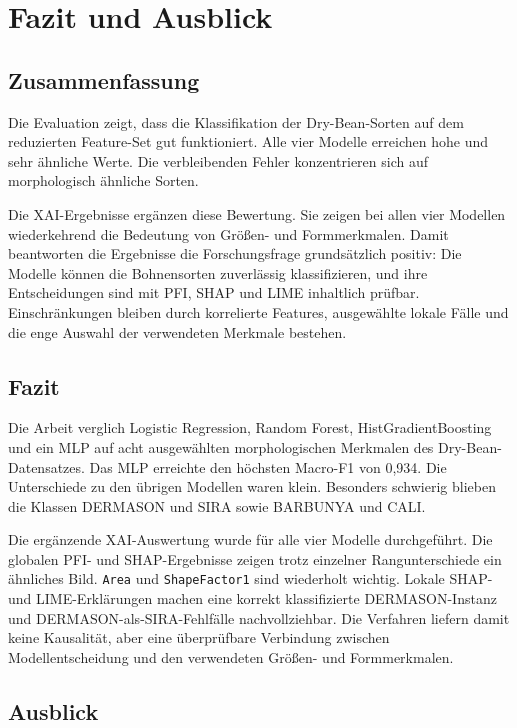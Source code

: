 \chapter{Fazit und Ausblick}\label{chap:Fazit-und-Ausblick}


\section{Zusammenfassung}

Die Evaluation zeigt, dass die Klassifikation der Dry-Bean-Sorten auf dem reduzierten Feature-Set gut funktioniert. Alle vier Modelle erreichen hohe und sehr ähnliche Werte. Die verbleibenden Fehler konzentrieren sich auf morphologisch ähnliche Sorten.

Die XAI-Ergebnisse ergänzen diese Bewertung. Sie zeigen bei allen vier Modellen wiederkehrend die Bedeutung von Größen- und Formmerkmalen. Damit beantworten die Ergebnisse die Forschungsfrage grundsätzlich positiv: Die Modelle können die Bohnensorten zuverlässig klassifizieren, und ihre Entscheidungen sind mit PFI, SHAP und LIME inhaltlich prüfbar. Einschränkungen bleiben durch korrelierte Features, ausgewählte lokale Fälle und die enge Auswahl der verwendeten Merkmale bestehen.


\section{Fazit}

Die Arbeit verglich Logistic Regression, Random Forest, HistGradientBoosting und ein MLP auf acht ausgewählten morphologischen Merkmalen des Dry-Bean-Datensatzes. Das MLP erreichte den höchsten Macro-F1 von 0{,}934. Die Unterschiede zu den übrigen Modellen waren klein. Besonders schwierig blieben die Klassen DERMASON und SIRA sowie BARBUNYA und CALI.

Die ergänzende XAI-Auswertung wurde für alle vier Modelle durchgeführt. Die globalen PFI- und SHAP-Ergebnisse zeigen trotz einzelner Rangunterschiede ein ähnliches Bild. \texttt{Area} und \texttt{ShapeFactor1} sind wiederholt wichtig. Lokale SHAP- und LIME-Erklärungen machen eine korrekt klassifizierte DERMASON-Instanz und DERMASON-als-SIRA-Fehlfälle nachvollziehbar. Die Verfahren liefern damit keine Kausalität, aber eine überprüfbare Verbindung zwischen Modellentscheidung und den verwendeten Größen- und Formmerkmalen.

\section{Ausblick}

